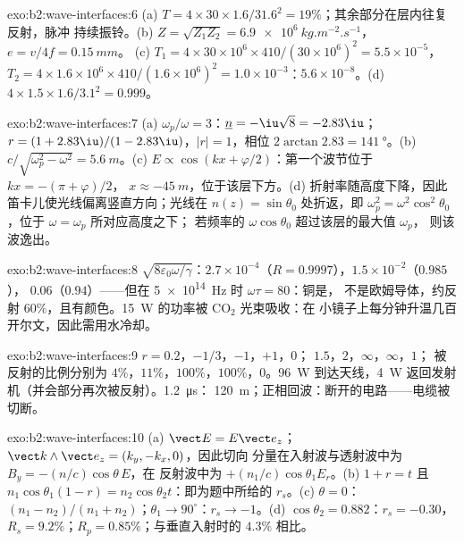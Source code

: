 \begin{solution}{exo:b2:wave-interfaces:6}
(a) $T = 4 \times 30 \times 1.6/31.6^2 = 19\%$；其余部分在层内往复反射，脉冲
持续振铃。(b) $Z = \sqrt{Z_1Z_2} = \qty{6.9e6}{kg.m^{-2}.s^{-1}}$，$e = v/4f = \qty{0.15}{mm}$。
(c) $T_1 = 4 \times 30 \times 10^6 \times 410/(30 \times 10^6)^2 = 5.5 \times 10^{-5}$，$T_2 = 4 \times 1.6 \times
10^6 \times 410/(1.6 \times 10^6)^2 = 1.0 \times 10^{-3}$：$5.6 \times 10^{-8}$。(d) $4 \times 1.5 \times 1.6/
3.1^2 = 0.999$。
\end{solution}

\begin{solution}{exo:b2:wave-interfaces:7}
(a) $\omega_p/\omega = 3$：$\underline n = -\iu\sqrt8 = -2.83\iu$；$r = (1 + 2.83\iu)/(1 - 2.83
\iu)$，$|r| = 1$，相位 $2\arctan2.83 = \qty{141}{\degree}$。(b) $c/\sqrt{\omega_p^2 - \omega^2}
= \qty{5.6}{m}$。(c) $E \propto \cos(kx + \varphi/2)$：第一个波节位于 $kx = -(\pi + \varphi)/2$，
$x \approx \qty{-45}{m}$，位于该层下方。(d) 折射率随高度下降，因此
笛卡儿使光线偏离竖直方向；光线在
$n(z) = \sin\theta_0$ 处折返，即 $\omega_p^2 = \omega^2\cos^2\theta_0$，位于 $\omega = \omega_p$ 所对应高度之下；
若频率的 $\omega\cos\theta_0$ 超过该层的最大值 $\omega_p$，
则该波逸出。
\end{solution}

\begin{solution}{exo:b2:wave-interfaces:8}
$\sqrt{8\varepsilon_0\omega/\gamma}$：$2.7 \times 10^{-4}$（$R = 0.9997$），$1.5 \times 10^{-2}$（$0.985$），
$0.06$（$0.94$）——但在 \qty{5e14}{Hz} 时 $\omega\tau = 80$：铜是，
不是欧姆导体，约反射 $60\%$，且有颜色。\qty{15}{W}
的功率被 CO$_2$ 光束吸收：在
小镜子上每分钟升温几百开尔文，因此需用水冷却。
\end{solution}

\begin{solution}{exo:b2:wave-interfaces:9}
$r = 0.2$，$-1/3$，$-1$，$+1$，$0$； $1.5$，$2$，$\infty$，$\infty$，$1$；
被反射的比例分别为 $4\%$，$11\%$，$100\%$，$100\%$，$0$。\qty{96}{W} 到达天线，\qty{4}{W}
返回发射机（并会部分再次被反射）。\qty{1.2}{\micro s}：
\qty{120}{m}；正相回波：断开的电路——电缆被切断。
\end{solution}

\begin{solution}{exo:b2:wave-interfaces:10}
(a) $\vect E = E\vect e_z$；$\vect k\wedge\vect e_z = (k_y, -k_x, 0)$，因此切向
分量在入射波与透射波中为 $B_y = -(n/c)\cos\theta\,E$，在
反射波中为 $+(n_1/c)\cos\theta_1E_r$。(b) $1 + r = t$ 且 $n_1\cos\theta_1
(1 - r) = n_2\cos\theta_2t$：即为题中所给的 $r_s$。(c) $\theta = 0$：$(n_1 - n_2)/(n_1 +
n_2)$；$\theta_1 \to 90^\circ$：$r_s \to -1$。(d) $\cos\theta_2 = 0.882$：$r_s = -0.30$，$R_s =
9.2\%$；$R_p = 0.85\%$；与垂直入射时的 $4.3\%$ 相比。
\end{solution}

